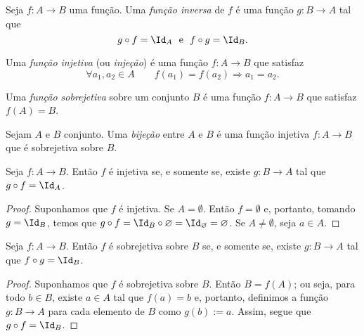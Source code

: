 \begin{defi}
	Seja $f: A \to B$ uma função. Uma \emph{função inversa} de $f$ é uma função $g: B \to A$ tal que
	\begin{equation*}
	g \circ f = \Id_A \e f \circ g = \Id_B.
	\end{equation*}
\end{defi}

\begin{defi}
	Uma \emph{função injetiva} (ou \emph{injeção}) é uma função $f: A \to B$ que satisfaz
	\begin{equation*}
	\forall a_1,a_2 \in A \qquad f(a_1)=f(a_2) \Rightarrow a_1=a_2.
	\end{equation*}
\end{defi}

\begin{defi}
	Uma \emph{função sobrejetiva} sobre um conjunto $B$ é uma função $f: A \to B$ que satisfaz $f(A)=B$.
\end{defi}

\begin{defi}
	Sejam $A$ e $B$ conjunto. Uma \emph{bijeção} entre $A$ e $B$ é uma função injetiva $f: A \to B$ que é sobrejetiva sobre $B$.
\end{defi}

\begin{prop}
\label{prop:func.inv.esq}
	Seja $f: A \to B$. Então $f$ é injetiva se, e somente se, existe $g: B \to A$ tal que $g \circ f = \Id_A$.
\end{prop}
\begin{proof}
	Suponhamos que $f$ é injetiva. Se $A = \emptyset$. Então $f=\emptyset$ e, portanto, tomando $g=\Id_B$, temos que $g \circ f = \Id_B \circ \emptyset = \Id_\emptyset = \emptyset$.
	Se $A \neq \emptyset$, seja $a \in A$.
	
	
\end{proof}

\begin{prop}
\label{prop:func.inv.dir}
	Seja $f: A \to B$. Então $f$ é sobrejetiva sobre $B$ se, e somente se, existe $g: B \to A$ tal que $f \circ g = \Id_B$.
\end{prop}
\begin{proof}
	Suponhamos que $f$ é sobrejetiva sobre $B$. Então $B=f(A)$; ou seja, para todo $b \in B$, existe $a \in A$ tal que $f(a)=b$ e, portanto, definimos a função $g: B \to A$ para cada elemento de $B$ como $g(b) := a$. Assim, segue que $g \circ f = \Id_B$.
\end{proof}

